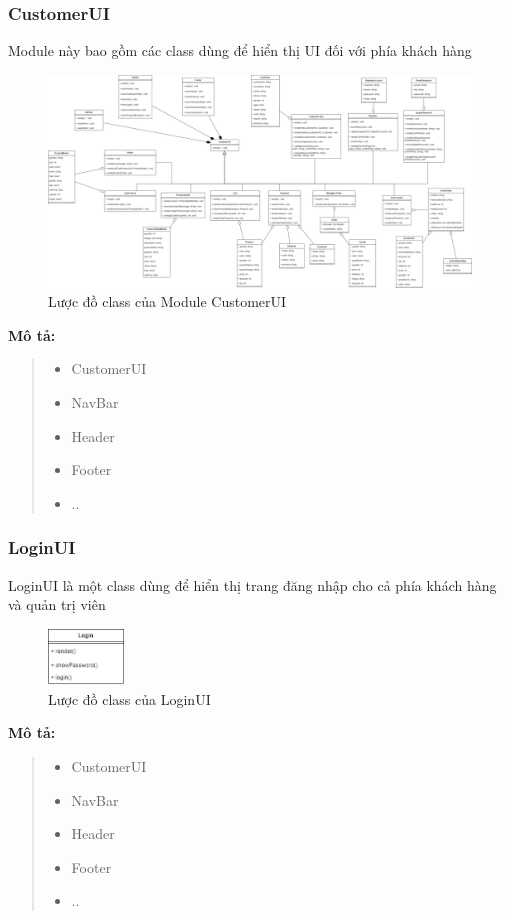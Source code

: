 \subsubsection{CustomerUI}
Module này bao gồm các class dùng để hiển thị UI đối với phía khách hàng
\begin{figure}[!htp]
	\centering
	\includegraphics[width=17cm]{img/Architecture/UI/customer UI.png}
	\newline
	\caption{Lược đồ class của Module CustomerUI}
\end{figure}
\textbf{Mô tả:}
\begin{quote}
	\begin{itemize}
		\item CustomerUI
		\item NavBar
		\item Header
		\item Footer
		\item ..
	\end{itemize}
\end{quote}

\subsubsection{LoginUI}
LoginUI là một class dùng để hiển thị trang đăng nhập cho cả phía khách hàng và quản trị viên
\begin{figure}[!htp]
	\centering
	\includegraphics[width=2cm]{img/Architecture/UI/loginUI.png}
	\newline
	\caption{Lược đồ class của LoginUI}
\end{figure}
\textbf{Mô tả:}
\begin{quote}
	\begin{itemize}
		\item CustomerUI
		\item NavBar
		\item Header
		\item Footer
		\item ..
	\end{itemize}
\end{quote}

